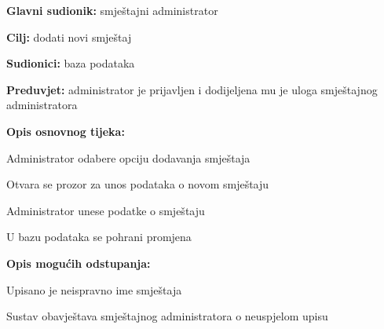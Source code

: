                         \noindent {}
					\begin{packed_item}
	
						\item \textbf{Glavni sudionik: }smještajni administrator
						\item  \textbf{Cilj:} dodati novi smještaj
						\item  \textbf{Sudionici:} baza podataka
						\item  \textbf{Preduvjet:} administrator je prijavljen i dodijeljena mu je uloga smještajnog administratora
						\item  \textbf{Opis osnovnog tijeka:}
						
						\item[] \begin{packed_enum}
	
							\item Administrator odabere opciju dodavanja smještaja
							\item Otvara se prozor za unos podataka o novom smještaju
							\item Administrator unese podatke o smještaju
							\item U bazu podataka se pohrani promjena
						\end{packed_enum}
						
						\item  \textbf{Opis mogućih odstupanja:}
						
						\item[] \begin{packed_item}
	
							\item[3.a] Upisano je neispravno ime smještaja
							\item[] \begin{packed_enum}
								
								\item Sustav obavještava smještajnog administratora o neuspjelom upisu
								
							\end{packed_enum}
       
						\end{packed_item}
					\end{packed_item}

